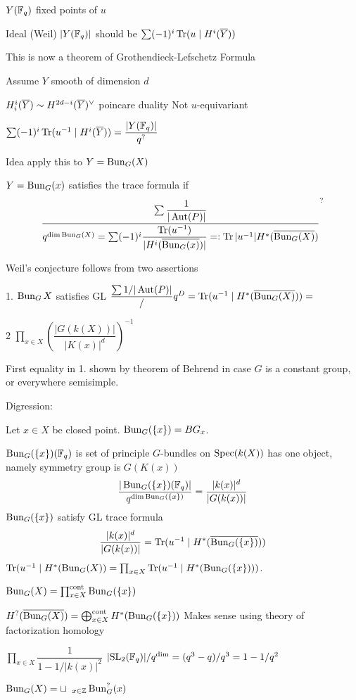 $Y(\mathbb{F}_q)$ fixed points of $u$


Ideal (Weil)
$|Y(\mathbb{F}_q)|$ should be $\sum (-1)^i \operatorname{Tr}(u \;|\; H^i(\overline{Y}))$


This is now a theorem of Grothendieck-Lefschetz Formula


Assume $Y$ smooth of dimension $d$

$H_i^i(\overline{Y}) \sim H^{2d-i}(\overline{Y})^\vee$ poincare duality
Not $u$-equivariant

$\sum (-1)^i \operatorname{Tr}(u^{-1} \;|\; H^i(\overline{Y}))= \dfrac{|Y(\mathbb{F}_q)|}{q^?}$



Idea apply this to $Y= \operatorname{Bun}_G(X)$

\begin{dfn}
$Y= \operatorname{Bun}_G(x)$ satisfies the trace formula if
	\[
	\dfrac{ \sum \dfrac{1}{|\operatorname{Aut}(P)|}}{ q^{\dim \operatorname{Bun}_G(X)}= \sum (-1)^i \dfrac{\operatorname{Tr}(u^{-1})}{|H^i(\overline{\operatorname{Bun}_G(x)})|} =: \operatorname{Tr}|u^{-1}| H^*(\overline{\operatorname{Bun}_G(X)})}^?
	\]
\end{dfn}


Weil's conjecture follows from two assertions

1. $\operatorname{Bun}_G X$ satisfies GL
$\dfrac{\sum 1/|\operatorname{Aut}(P)|}/q^D= \operatorname{Tr}(u^{-1}\;|\; H^*(\overline{\operatorname{Bun}_G(X)}))= $

2 $\prod_{x \in X} \left(\dfrac{|G(k(X))|}{|K(x)|^d}\right)^{-1}$



First equality in 1. shown by theorem of Behrend in case $G$ is a constant group, or everywhere semisimple. 


Digression:

Let $x \in X$ be closed point. $\operatorname{Bun}_G(\{x\})= BG_x$.


$\operatorname{Bun}_G(\{x\})(\mathbb{F}_q)$ is set of principle $G$-bundles on $\operatorname{Spec}(k(X))$
has one object, namely symmetry group is $G(K(x))$
	\[
	\dfrac{|\operatorname{Bun}_G(\{x\})(\mathbb{F}_q)|}{q^{\dim \operatorname{Bun}_G(\{x\})}}= \dfrac{|k(x)|^d}{|G(k(x))|}
	\]
$\operatorname{Bun}_G(\{x\})$ satisfy GL trace formula
	\[
	\dfrac{|k(x)|^d}{|G(k(x))|}= \operatorname{Tr}(u^{-1} \;|\; H^*(\overline{\operatorname{Bun}_G(\{x\})}))
	\]
$\operatorname{Tr}(u^{-1} \;|\; H^*(\operatorname{Bun}_G(X))= \prod_{x \in X} \operatorname{Tr}(u^{-1}\;|\; H^*(\operatorname{Bun}_G(\{x\})))$.

$\operatorname{Bun}_G(X)= \prod_{x \in X}^\text{cont} \operatorname{Bun}_G(\{x\})$

$H^?(\overline{\operatorname{Bun}_G(X)})= \bigoplus_{x \in X}^\text{cont} H^*(\operatorname{Bun}_G(\{x\}))$
Makes sense using theory of factorization homology

$\prod_{x \in X} \dfrac{1}{1- 1/|k(x)|^2}$
$|\text{SL}_2(\mathbb{F}_q)|/q^{\dim}= (q^3-q)/q^3= 1-1/q^2$

$\operatorname{Bun}_G(X)= \sqcup \phantom{a}_{x \in \mathbb{Z}} \operatorname{Bun}_G^?(x)$


































